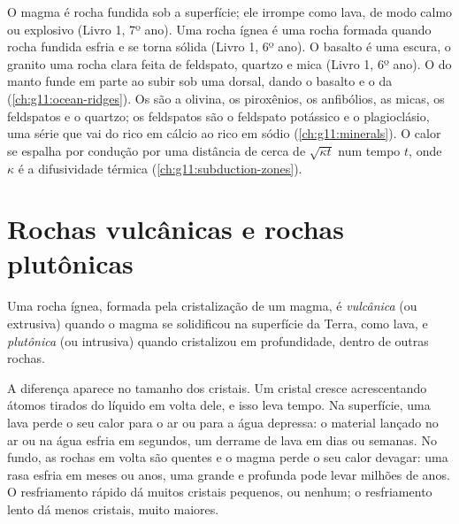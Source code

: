 \begin{recall}
O magma é rocha fundida sob a superfície; ele irrompe como lava, de modo
calmo ou explosivo (Livro 1, 7º ano). Uma rocha ígnea é uma rocha formada
quando rocha fundida esfria e se torna sólida (Livro 1, 6º ano). O basalto é uma  escura, o granito
uma rocha clara feita de feldspato, quartzo e mica (Livro 1, 6º ano). O
 do manto funde em parte ao subir sob uma dorsal, dando o basalto e
o  da  (\cref{ch:g11:ocean-ridges}). Os  são a olivina, os piroxênios, os anfibólios, as micas,
os feldspatos e o quartzo; os feldspatos são o feldspato potássico e o
plagioclásio, uma série que vai do rico em cálcio ao rico em sódio
(\cref{ch:g11:minerals}). O calor se espalha por condução por uma distância
de cerca de $\sqrt{\kappa t}$ num tempo $t$, onde
$\kappa$ é a difusividade térmica (\cref{ch:g11:subduction-zones}).
\end{recall}

\section{Rochas vulcânicas e rochas plutônicas}

\begin{definition}\label{def:g11:igneous-rocks:volcanic-plutonic}
Uma rocha ígnea, formada pela cristalização de um magma, é
\emph{vulcânica}
(ou extrusiva) quando o magma se solidificou na superfície da Terra, como
lava, e \emph{plutônica} (ou intrusiva) quando cristalizou
em profundidade, dentro de outras rochas.
\end{definition}

A diferença aparece no tamanho dos cristais. Um cristal cresce acrescentando
átomos tirados do líquido em volta dele, e isso leva tempo. Na superfície,
uma lava perde o seu calor para o ar ou para a água depressa: o material
lançado no ar ou na água esfria em segundos, um derrame de lava em dias ou
semanas. No fundo, as rochas em volta são quentes e o magma perde o seu
calor devagar: uma  rasa esfria em meses ou anos, uma grande e
profunda pode levar milhões de anos. O resfriamento rápido dá muitos
cristais pequenos, ou nenhum; o resfriamento lento dá menos cristais,
muito maiores.

